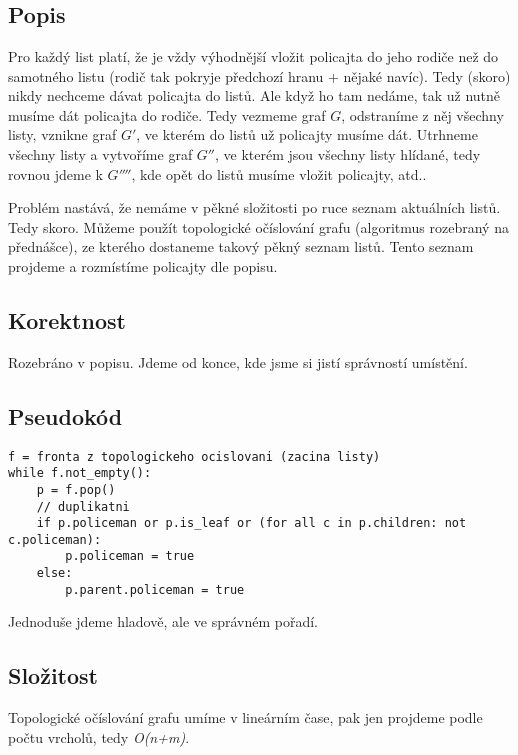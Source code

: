 \documentclass[a4paper]{article}
\begin{document}
\vspace{-4cm}
{\fontsize{12}{15}\selectfont \hspace{-0.5cm}}

\section{}
\subsection{Popis}
Pro každý list platí, že je vždy výhodnější vložit policajta do jeho rodiče než do samotného listu (rodič tak pokryje předchozí hranu + nějaké navíc). Tedy (skoro) nikdy nechceme dávat policajta do listů. Ale když ho tam nedáme, tak už nutně musíme dát policajta do rodiče. Tedy vezmeme graf $G$, odstraníme z něj všechny listy, vznikne graf $G'$, ve kterém do listů už policajty musíme dát. Utrhneme všechny listy a vytvoříme graf $G''$, ve kterém jsou všechny listy hlídané, tedy rovnou jdeme k $G''''$, kde opět do listů musíme vložit policajty, atd..

Problém nastává, že nemáme v pěkné složitosti po ruce seznam aktuálních listů. Tedy skoro. Můžeme použít topologické očíslování grafu (algoritmus rozebraný na přednášce), ze kterého dostaneme takový pěkný seznam listů. Tento seznam projdeme a rozmístíme policajty dle popisu.

\subsection{Korektnost}
Rozebráno v popisu. Jdeme od konce, kde jsme si jistí správností umístění.

\subsection{Pseudokód}
\begin{lstlisting}
f = fronta z topologickeho ocislovani (zacina listy)
while f.not_empty():
	p = f.pop()
	// duplikatni
	if p.policeman or p.is_leaf or (for all c in p.children: not c.policeman): 
		p.policeman = true
	else:
		p.parent.policeman = true
\end{lstlisting}
Jednoduše jdeme hladově, ale ve správném pořadí.

\subsection{Složitost}
Topologické očíslování grafu umíme v lineárním čase, pak jen projdeme podle počtu vrcholů, tedy \textit{O(n+m)}.
\end{document}
